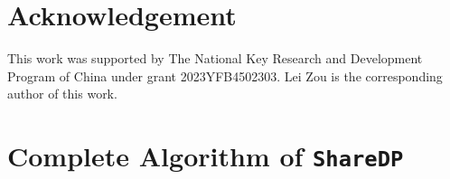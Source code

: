 \section*{Acknowledgement}
This work was supported by The National Key Research and Development Program of China under grant 2023YFB4502303. Lei Zou is the corresponding author of this work.





% 
% 

% 
\printbibliography


\clearpage
\appendix
\section{Complete Algorithm of \texttt{ShareDP}} \label{sec:appendix}



